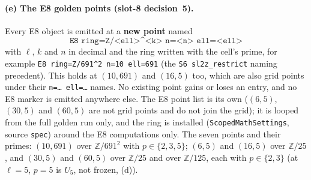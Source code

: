 \documentclass[11pt]{article}
\theoremstyle{remark}
\newcommand{\Z}{\mathbb{Z}}
\begin{document}
\paragraph{(e) The E8 golden points (slot-8 decision~5).}
Every E8 object is emitted at a \textbf{new point} named
\[
  \texttt{E8 ring=Z/<ell>\textasciicircum<k> n=<n> ell=<ell>}
\]
with $\ell$, $k$ and $n$ in decimal and the ring written with the cell's prime, for example
\texttt{E8 ring=Z/691\textasciicircum2 n=10 ell=691} (the \texttt{S6 sl2z\_restrict} naming
precedent). This holds at $(10,691)$ and $(16,5)$ too, which are also grid points under their
\texttt{n=\ldots\ ell=\ldots} names. No existing point gains or loses an entry, and no E8 marker is
emitted anywhere else. The E8 point list is its own ($(6,5)$, $(30,5)$ and $(60,5)$ are not grid
points and do not join the grid); it is looped from the full golden run only, and the ring is
installed (\texttt{ScopedMathSettings}, source \texttt{spec}) around the E8 computations only. The
seven points and their primes: $(10,691)$ over $\Z/691^2$ with $p\in\{2,3,5\}$; $(6,5)$ and
$(16,5)$ over $\Z/25$, and $(30,5)$ and $(60,5)$ over $\Z/25$ and over $\Z/125$, each with
$p\in\{2,3\}$ (at $\ell=5$, $p=5$ is $U_5$, not frozen, (d)).
\end{document}

